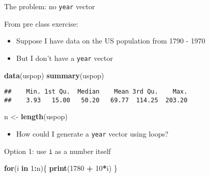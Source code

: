 \documentclass[ignorenonframetext,]{beamer}
\newenvironment{Shaded}{\begin{snugshade}}{\end{snugshade}}
\newcommand{\KeywordTok}[1]{\textcolor[rgb]{0.13,0.29,0.53}{\textbf{#1}}}
\newcommand{\DecValTok}[1]{\textcolor[rgb]{0.00,0.00,0.81}{#1}}
\newcommand{\StringTok}[1]{\textcolor[rgb]{0.31,0.60,0.02}{#1}}
\newcommand{\ControlFlowTok}[1]{\textcolor[rgb]{0.13,0.29,0.53}{\textbf{#1}}}
\newcommand{\OperatorTok}[1]{\textcolor[rgb]{0.81,0.36,0.00}{\textbf{#1}}}
\newcommand{\NormalTok}[1]{#1}
\providecommand{\tightlist}{%
	\setlength{\itemsep}{0pt}\setlength{\parskip}{0pt}}
\begin{document}
\begin{frame}[fragile]{The problem: no \texttt{year} vector}

From pre class exercise:

\begin{itemize}
\tightlist
\item
  Suppose I have data on the US population from 1790 - 1970
\item
  But I don't have a \texttt{year} vector
\end{itemize}

\begin{Shaded}
\begin{Highlighting}[]
\KeywordTok{data}\NormalTok{(uspop)}
\KeywordTok{summary}\NormalTok{(uspop)}
\end{Highlighting}
\end{Shaded}

\begin{verbatim}
##    Min. 1st Qu.  Median    Mean 3rd Qu.    Max. 
##    3.93   15.00   50.20   69.77  114.25  203.20
\end{verbatim}

\begin{Shaded}
\begin{Highlighting}[]
\NormalTok{n <-}\StringTok{ }\KeywordTok{length}\NormalTok{(uspop)}
\end{Highlighting}
\end{Shaded}

\begin{itemize}
\tightlist
\item
  How could I generate a \texttt{year} vector using loops?
\end{itemize}

\end{frame}

\begin{frame}[fragile]{Option 1: use \texttt{i} as a number itself}

\begin{Shaded}
\begin{Highlighting}[]
\ControlFlowTok{for}\NormalTok{(i }\ControlFlowTok{in} \DecValTok{1}\OperatorTok{:}\NormalTok{n)\{}
  \KeywordTok{print}\NormalTok{(}\DecValTok{1780} \OperatorTok{+}\StringTok{ }\DecValTok{10}\OperatorTok{*}\NormalTok{i)}
\NormalTok{\}}
\end{Highlighting}
\end{Shaded}

\end{frame}
\end{document}
